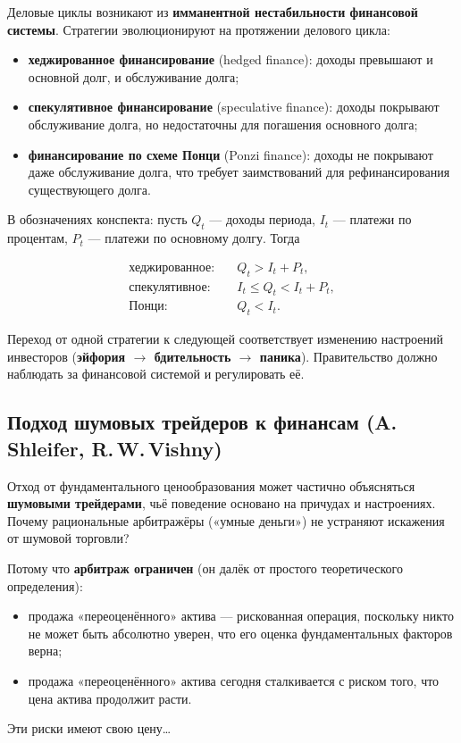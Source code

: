 \documentclass[10pt,a4paper]{article}
\begin{document}
Деловые циклы возникают из \textbf{имманентной нестабильности финансовой системы}. Стратегии эволюционируют на протяжении делового цикла:
\begin{itemize}[leftmargin=1.3em]
\item \textbf{хеджированное финансирование} (hedged finance): доходы превышают и основной долг, и обслуживание долга;
\item \textbf{спекулятивное финансирование} (speculative finance): доходы покрывают обслуживание долга, но недостаточны для погашения основного долга;
\item \textbf{финансирование по схеме Понци} (Ponzi finance): доходы не покрывают даже обслуживание долга, что требует заимствований для рефинансирования существующего долга.
\end{itemize}

В обозначениях конспекта: пусть $Q_t$ — доходы периода, $I_t$ — платежи по процентам, $P_t$ — платежи по основному долгу. Тогда
\begin{formulabox}
\begin{align*}
\text{хеджированное:}\quad & Q_t > I_t + P_t,\\
\text{спекулятивное:}\quad & I_t \le Q_t < I_t + P_t,\\
\text{Понци:}\quad & Q_t < I_t.
\end{align*}
\end{formulabox}

Переход от одной стратегии к следующей соответствует изменению настроений инвесторов (\textbf{эйфория $\to$ бдительность $\to$ паника}). Правительство должно наблюдать за финансовой системой и регулировать её.

\subsection{Подход шумовых трейдеров к финансам (A.\,Shleifer, R.\,W.\,Vishny)}

Отход от фундаментального ценообразования может частично объясняться \textbf{шумовыми трейдерами}, чьё поведение основано на причудах и настроениях. Почему рациональные арбитражёры («умные деньги») не устраняют искажения от шумовой торговли?

Потому что \textbf{арбитраж ограничен} (он далёк от простого теоретического определения):
\begin{itemize}[leftmargin=1.3em]
\item продажа «переоценённого» актива — рискованная операция, поскольку никто не может быть абсолютно уверен, что его оценка фундаментальных факторов верна;
\item продажа «переоценённого» актива сегодня сталкивается с риском того, что цена актива продолжит расти.
\end{itemize}
Эти риски имеют свою цену\ldots
\end{document}
